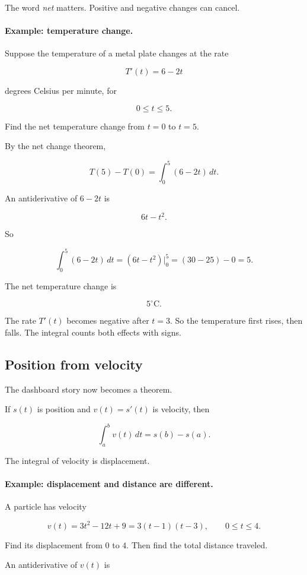 The word \emph{net} matters.  Positive and negative changes can cancel.

\paragraph{Example: temperature change.}
Suppose the temperature of a metal plate changes at the rate

\[
T'(t)=6-2t
\]

degrees Celsius per minute, for

\[
0\le t\le5.
\]

Find the net temperature change from \(t=0\) to \(t=5\).

By the net change theorem,

\[
T(5)-T(0)=\int_0^5 (6-2t)\,dt.
\]

An antiderivative of \(6-2t\) is

\[
6t-t^2.
\]

So

\[
\int_0^5 (6-2t)\,dt
=
(6t-t^2)\Big|_0^5
=
(30-25)-0
=
5.
\]

The net temperature change is

\[
\boxed{5^\circ\text{C}.}
\]

The rate \(T'(t)\) becomes negative after \(t=3\).  So the temperature first rises, then
falls.  The integral counts both effects with signs.

\subsection{Position from velocity}
\label{subsec:position-from-velocity-ftc2}

The dashboard story now becomes a theorem.

If \(s(t)\) is position and \(v(t)=s'(t)\) is velocity, then

\[
\boxed{
\int_a^b v(t)\,dt=s(b)-s(a).
}
\]

The integral of velocity is displacement.

\paragraph{Example: displacement and distance are different.}
A particle has velocity

\[
v(t)=3t^2-12t+9
=
3(t-1)(t-3),
\qquad 0\le t\le4.
\]

Find its displacement from \(0\) to \(4\).  Then find the total distance traveled.

An antiderivative of \(v(t)\) is


